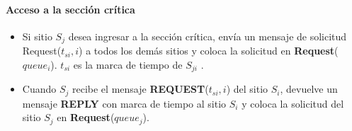\paragraph{Acceso a la secci\'on cr\'itica}
	\begin{itemize} 
		\item  Si sitio $S_{j}$ desea ingresar a la sección
		crítica, envía un mensaje de solicitud  Request($t_{si},
		i$) a todos los demás sitios y coloca la solicitud en
		\textbf{Request}($queue_{i}$).   $t_{si} $ es la marca de
		tiempo de  $S_{ji}$ .
		\item Cuando  $S_{j}$  recibe el mensaje  	\textbf{REQUEST}($t_{si},i$) del sitio  $S_{i}$, devuelve un mensaje \textbf{REPLY} con marca de tiempo al sitio $S_{i}$ y coloca la solicitud del sitio  $S_{j}$ en \textbf{Request}($ queue_{j}$). 				   
	\end{itemize}
 
